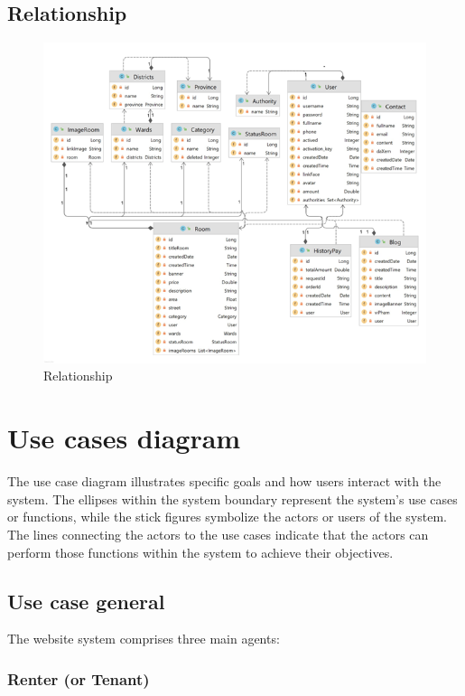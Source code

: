 \documentclass[../Main.tex]{subfiles}
\begin{document}
\subsection{Relationship}

\begin{figure}[H]
    \centering
    \includegraphics[width=\textwidth]{Figure/Picture7.png}
    \caption{Relationship}
    \label{fig:relationship}
\end{figure}

\section{Use cases diagram}

The use case diagram illustrates specific goals and how users interact with the system.
The ellipses within the system boundary represent the system's use cases or functions, while the stick figures symbolize the actors or users of the system.
The lines connecting the actors to the use cases indicate that the actors can perform those functions within the system to achieve their objectives.

\subsection{Use case general}

The website system comprises three main agents:
\subsubsection{Renter (or Tenant)}
\end{document}
